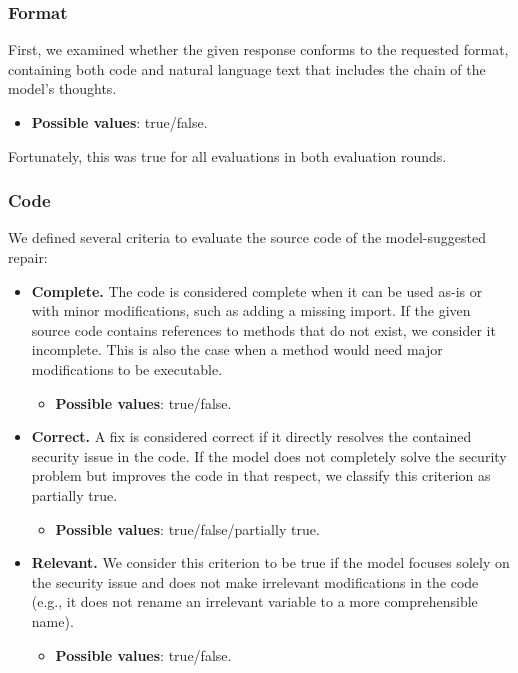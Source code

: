 \subsubsection{Format}

First, we examined whether the given response conforms to the requested format, containing both code and natural language text that includes the chain of the model's thoughts.
\begin{itemize}
	\item \textbf{Possible values}: true/false.
\end{itemize}
Fortunately, this was true for all evaluations in both evaluation rounds.

\subsubsection{Code}

We defined several criteria to evaluate the source code of the model-suggested repair:

\begin{itemize}
	\item \textbf{Complete.} The code is considered complete when it can be used as-is or with minor modifications, such as adding a missing import. If the given source code contains references to methods that do not exist, we consider it incomplete. This is also the case when a method would need major modifications to be executable.
	\begin{itemize}
		\item \textbf{Possible values}: true/false.
	\end{itemize}
	
	\item \textbf{Correct.} %
A fix is considered correct if it directly resolves the contained security issue in the code. If the model does not completely solve the security problem but improves the code in that respect, we classify this criterion as partially true.
\begin{itemize}
	\item \textbf{Possible values}: true/false/partially true.
\end{itemize}

\item \textbf{Relevant.} We consider this criterion to be true if the model focuses solely on the security issue and does not make irrelevant modifications in the code (e.g., it does not rename an irrelevant variable to a more comprehensible name).
\begin{itemize}
	\item \textbf{Possible values}: true/false.
\end{itemize}

\end{itemize} %

